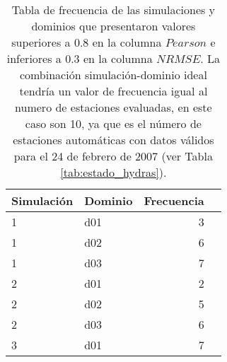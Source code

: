 \begin{table}[H]
\centering
\caption{Tabla de frecuencia de las simulaciones y dominios que presentaron valores superiores a 0.8 en la columna $Pearson$ e inferiores a 0.3  en la columna $NRMSE$. La combinación simulación-dominio ideal tendría un valor de frecuencia igual al numero de estaciones evaluadas, en este caso son 10, ya que es el número de estaciones automáticas con datos válidos para el 24 de febrero de 2007 (ver Tabla \ref{tab:estado_hydras}).}
\label{tabla:resultado_dom_sum_dom} %
\begin{tabular}{llrr}
\toprule
   Simulación & Dominio &   Frecuencia \\
\midrule
1   &   d01 &      3 \\
1   &   d02 &      6 \\
1   &   d03 &      7 \\
2   &   d01 &      2 \\
2   &   d02 &      5 \\
2   &   d03 &      6 \\
3   &   d01 &      7 \\

\end{tabular}
\end{table}
